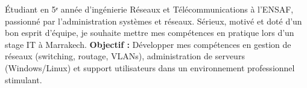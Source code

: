 
\begin{cvparagraph}
    Étudiant en 5ᵉ année d'ingénierie Réseaux et Télécommunications à l'ENSAF, passionné par l'administration systèmes et réseaux. Sérieux, motivé et doté d'un bon esprit d'équipe, je souhaite mettre mes compétences en pratique lors d'un stage IT à Marrakech.
    \newline
    \textbf{Objectif :} Développer mes compétences en gestion de réseaux (switching, routage, VLANs), administration de serveurs (Windows/Linux) et support utilisateurs dans un environnement professionnel stimulant.
\end{cvparagraph}